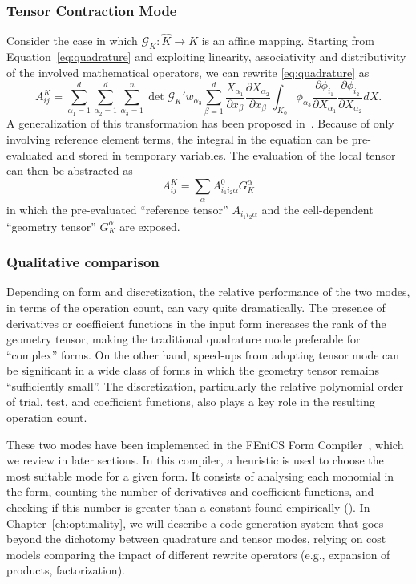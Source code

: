 \subsubsection{Tensor Contraction Mode}
Consider the case in which $\mathcal{G}_K : \hat{K} \rightarrow K$ is an affine mapping. Starting from Equation~\ref{eq:quadrature} and exploiting linearity, associativity and distributivity of the involved mathematical operators, we can rewrite \ref{eq:quadrature} as
\begin{equation}
\label{eq:tensor}
A_{ij}^K = \sum_{\alpha_1=1}^d \sum_{\alpha_2=1}^d \sum_{\alpha_3=1}^n \operatorname{det} \mathcal{G}_K' w_{\alpha_3} \sum_{\beta=1}^d \frac{X_{\alpha_1}}{\partial x_{\beta}} \frac{\partial X_{\alpha_2}}{\partial x_{\beta}} \int_{K_0} \phi_{\alpha_3} \frac{\partial \phi_{i_1}}{\partial X_{\alpha_1}} \frac{\partial \phi_{i_2}}{\partial X_{\alpha_2}} dX.
\end{equation}
A generalization of this transformation has been proposed in~\cite{Kirby:TC}. Because of only involving reference element terms, the integral in the equation can be pre-evaluated and stored in temporary variables. The evaluation of the local tensor can then be abstracted as
\begin{equation}
A_{ij}^K = \sum_{\alpha} A_{i_1 i_2 \alpha}^0 G_{K}^\alpha
\end{equation}
in which the pre-evaluated ``reference tensor'' $A_{i_1 i_2 \alpha}$ and the cell-dependent ``geometry tensor'' $G_{K}^\alpha$ are exposed. 


\subsubsection{Qualitative comparison}
Depending on form and discretization, the relative performance of the two modes, in terms of the operation count, can vary quite dramatically. The presence of derivatives or coefficient functions in the input form increases the rank of the geometry tensor, making the traditional quadrature mode preferable for ``complex'' forms. On the other hand, speed-ups from adopting tensor mode can be significant in a wide class of forms in which the geometry tensor remains ``sufficiently small''. The discretization, particularly the relative polynomial order of trial, test, and coefficient functions, also plays a key role in the resulting operation count. 

These two modes have been implemented in the FEniCS Form Compiler~\cite{FFC-TC}, which we review in later sections. In this compiler, a heuristic is used to choose the most suitable mode for a given form. It consists of analysing each monomial in the form, counting the number of derivatives and coefficient functions, and checking if this number is greater than a constant found empirically (\cite{Fenics}). In Chapter~\ref{ch:optimality}, we will describe a code generation system that goes beyond the dichotomy between quadrature and tensor modes, relying on cost models comparing the impact of different rewrite operators (e.g., expansion of products, factorization).


